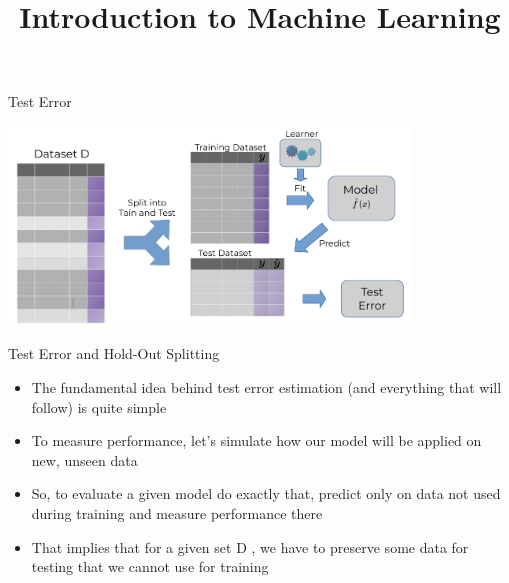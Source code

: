 \documentclass[11pt,compress,t,notes=noshow, xcolor=table]{beamer}
\title{Introduction to Machine Learning}
\institute{\href{https://compstat-lmu.github.io/lecture_i2ml/}{compstat-lmu.github.io/lecture\_i2ml}}
\date{}
\begin{document}















\begin{vbframe}{Test Error}

\includegraphics[width=0.8\textwidth, trim=270 0 0 0, clip]{figure_man/test_error.pdf}

\end{vbframe}

\begin{vbframe}{Test Error and Hold-Out Splitting}
\begin{itemize}
\item The fundamental idea behind test error estimation (and everything that will follow) is quite simple
\item To measure performance, let’s simulate how our model will be applied on new, unseen data
\item So, to evaluate a given model do exactly that, predict only on data not used during training and measure performance there
\item That implies that for a given set D , we have to preserve some data for testing that we cannot use for training
\end{itemize}
\end{vbframe}
\end{document}
